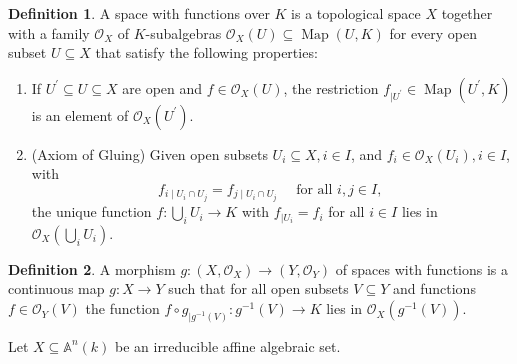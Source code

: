\documentclass[12pt,a4paper]{book}
\newenvironment{enu}{\begin{enumerate}[(1)]}{\end{enumerate}}
\theoremstyle{definition}
\newtheorem{defn}{Definition}[section]
\begin{document}
\begin{defn}
    A space with functions over $K$ is a topological space $X$ together with a family $\mathscr{O}_X$ of $K$-subalgebras $\mathscr{O}_X(U) \subseteq \operatorname{Map}(U, K)$ for every open subset $U \subseteq X$ that satisfy the following properties:
\begin{enu}
\item If $U^{\prime} \subseteq U \subseteq X$ are open and $f \in \mathscr{O}_X(U)$, the restriction $f_{\mid U^{\prime}} \in \operatorname{Map}\left(U^{\prime}, K\right)$ is an element of $\mathscr{O}_X\left(U^{\prime}\right)$.
\item (Axiom of Gluing) Given open subsets $U_i \subseteq X, i \in I$, and $f_i \in \mathscr{O}_X\left(U_i\right), i \in I$, with
$$
f_{i \mid U_i \cap U_j}=f_{j \mid U_i \cap U_j} \quad \text { for all } i, j \in I \text {, }
$$
the unique function $f: \bigcup_i U_i \rightarrow K$ with $f_{\mid U_i}=f_i$ for all $i \in I$ lies in $\mathscr{O}_X\left(\bigcup_i U_i\right)$. 
\end{enu}
\end{defn}
\begin{defn}
    A morphism $g:\left(X, \mathscr{O}_X\right) \rightarrow\left(Y, \mathscr{O}_Y\right)$ of spaces with functions is a continuous map $g: X \rightarrow Y$ such that for all open subsets $V \subseteq Y$ and functions $f \in \mathscr{O}_Y(V)$ the function $f \circ g_{\mid g^{-1}(V)}: g^{-1}(V) \rightarrow K$ lies in $\mathscr{O}_X\left(g^{-1}(V)\right)$.
\end{defn} 
Let $X \subseteq \mathbb{A}^n(k)$ be an irreducible affine algebraic set. 
\end{document}
